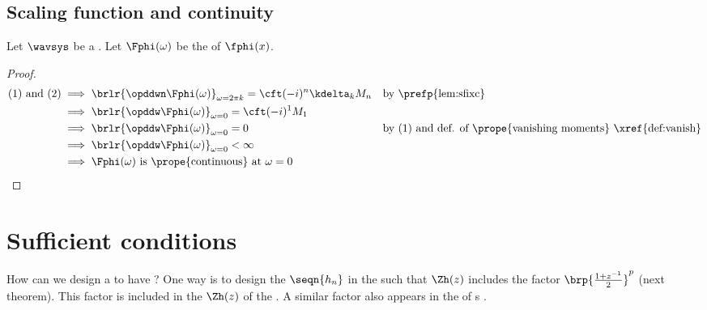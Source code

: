 \subsection{Scaling function and continuity}
\begin{theorem}
\label{thm:vanish_continuous}
Let $\wavsys$ be a  .
Let $\Fphi(\omega)$ be the   of $\fphi(x)$.
\end{theorem}
\begin{proof}
  \begin{align*}
    \text{(1) and (2)}
      &\implies \brlr{\opddwn  \Fphi(\omega)}_{\omega=2\pi k}=\cft (-i)^n \kdelta_k M_n
      && \text{by \prefp{lem:sfixc}}
    \\&\implies \brlr{\opddw \Fphi(\omega)}_{\omega=0} = \cft (-i)^1 M_1 
    \\&\implies \brlr{\opddw \Fphi(\omega)}_{\omega=0} = 0
      && \text{by (1) and def. of \prope{vanishing moments} \xref{def:vanish}}
    \\&\implies \brlr{\opddw \Fphi(\omega)}_{\omega=0} < \infty
    \\&\implies \text{$\Fphi(\omega)$ is \prope{continuous} at $\omega=0$}
  \end{align*}
\end{proof}

\section{Sufficient conditions}
How can we design a   to have ?
One way is to design the   $\seqn{h_n}$ in the  
such that $\Zh(z)$ includes the factor $\brp{\frac{1+z^{-1}}{2}}^p$ (next theorem).
This factor is included in the $\Zh(z)$ of the .
A similar factor  also appears in the   
of s .

